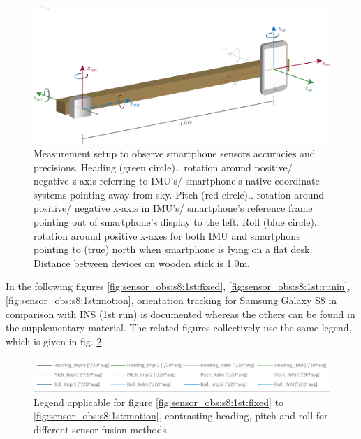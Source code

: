 \documentclass[review]{elsarticle}
\begin{document}
\begin{figure}[htbp!]
\begin{center}
	\centering
	\includegraphics[keepaspectratio, width=1\columnwidth]{graphics/sensor_construction}
	\caption{Measurement setup to observe smartphone sensors accuracies and precisions. Heading (green circle).. rotation around positive/ negative z-axis referring to \gls{IMU}'s/ smartphone's native coordinate systems pointing away from sky. Pitch (red circle).. rotation around positive/ negative x-axis in \gls{IMU}'s/ smartphone's reference frame pointing out of smartphone's display to the left. Roll (blue circle).. rotation around positive x-axes for both \gls{IMU} and smartphone pointing to (true) north when smartphone is lying on a flat desk. Distance between devices on wooden stick is 1.0m.}
	\label{fig:technology:sensor:construction}
\end{center}
\end{figure}

In the following figures \ref{fig:sensor_obs:s8:1st:fixed}, \ref{fig:sensor_obs:s8:1st:runin}, \ref{fig:sensor_obs:s8:1st:motion}, orientation tracking for Samsung Galaxy S8 in comparison with \gls{INS} (1st run) is documented whereas the others can be found in the supplementary material. The related figures collectively use the same legend, which is given in fig. \ref{fig:sensor_obs:s8:1st:legend}.

\begin{figure}[htbp!]
\begin{center}
	\centering
	\includegraphics[keepaspectratio, width=0.9\columnwidth]{graphics/Sensor_Galaxy_run1/sensor_diagramms_galaxys8_legend_trim}
	\caption{Legend applicable for figure \ref{fig:sensor_obs:s8:1st:fixed} to \ref{fig:sensor_obs:s8:1st:motion}, contrasting \textcolor{heading_green}{heading}, \textcolor{pitch_orange}{pitch} and \textcolor{roll_blue}{roll} for different sensor fusion methods.}
	\label{fig:sensor_obs:s8:1st:legend}
\end{center}
\end{figure}
\end{document}

